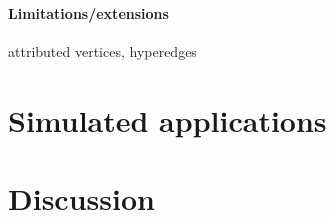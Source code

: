 \paragraph{Limitations/extensions}

attributed vertices, hyperedges

\section{Simulated applications} 

\label{sec:apps}

\section{Discussion} 

\label{sec:discussion}


